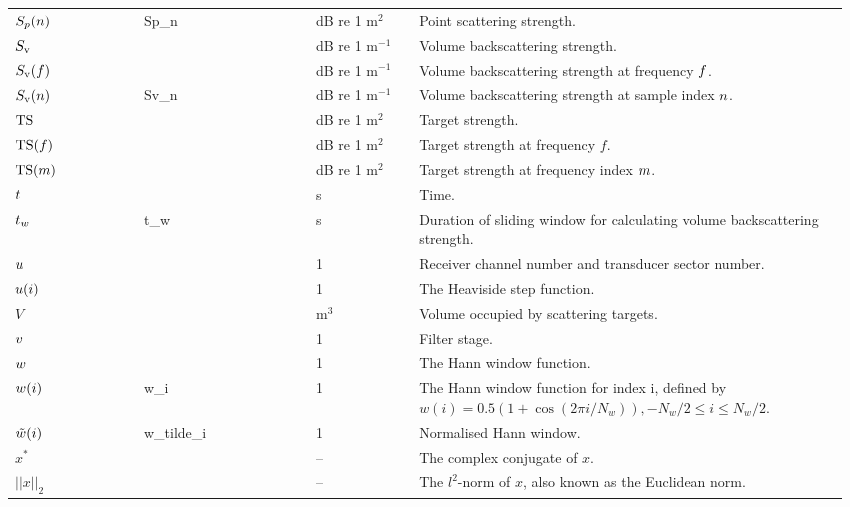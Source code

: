 \documentclass[12pt,a4paper]{article}
\renewcommand{\code}[1]{\texttt{\detokenize{#1}}}
\begin{document}
\begin{longtable}{p{0.15\linewidth} p{0.20\linewidth} p{0.12\linewidth} p{0.5\linewidth} }
$S_p(n)$  & Sp\_n & dB re 1 $\textrm{m}^2$ & Point scattering strength.\\
$S_{\textrm{v}}$  & & dB re 1 $\textrm{m}^{-1}$ & Volume backscattering strength.\\
$S_{\textrm{v}}(f)$ & & dB re 1 $\textrm{m}^{-1}$ & Volume backscattering strength at frequency $f$.\\
$S_{\textrm{v}}(n)$ & Sv\_n & dB re 1 $\textrm{m}^{-1}$ & Volume backscattering strength at sample index $n$.\\

$\textrm{TS}$ & & dB re 1 $\textrm{m}^2$ & Target strength.\\
$\textrm{TS}(f)$ & & dB re 1 $\textrm{m}^2$ & Target strength at frequency $f$.\\
$\textrm{TS}(m)$ & \code{TS_m} & dB re 1 $\textrm{m}^{2}$ & Target strength at frequency index $m$.\\

$t$ & & s &  Time.\\
$t_w$ & t\_w & s & Duration of sliding window for calculating volume backscattering strength.\\

$u$ & & 1 & Receiver channel number and transducer sector number.\\
$u(i)$ & & 1 & The Heaviside step function. \\
$V$ & & $\textrm{m}^3$ & Volume occupied by scattering targets.\\
$v$ & & 1 & Filter stage.\\

$w$ & & 1 & The Hann window function.\\
$w(i)$ & w\_i & 1 & The Hann window function for index i, defined by $w(i) = 0.5(1+\cos (2\pi i /N_w)), -N_w/2 \leq i \leq N_w/2$.\\
$\tilde{w}(i)$ & w\_tilde\_i & 1 & Normalised Hann window.\\

$x^*$ & & -- & The complex conjugate of $x$.\\
$||x||_2$ & & -- & The $l^2$-norm of $x$, also known as the Euclidean norm.\\


\end{longtable}
\end{document}
